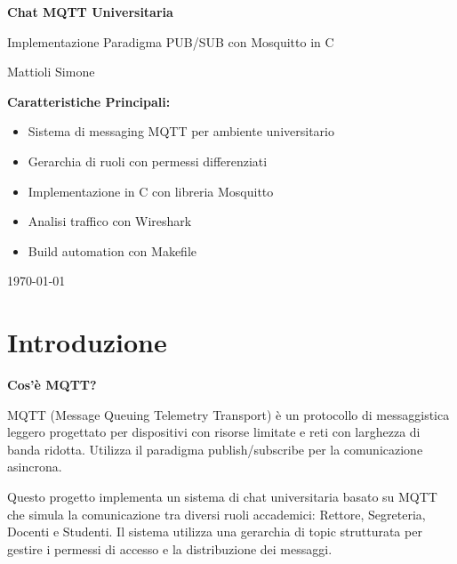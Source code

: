 \documentclass[12pt,a4paper]{article}
\begin{document}
\begin{titlepage}
    \centering
    \vspace*{2cm}
    
    {\Huge\bfseries Chat MQTT Universitaria}
        
    \vspace{2cm}
    {\large Implementazione Paradigma PUB/SUB con Mosquitto in C}
    
    \vspace{3cm}
    \vspace{1cm}
    {\Large Mattioli Simone}
    \vspace{3cm}
    
    \begin{tcolorbox}[colback=blue!5!white,colframe=blue!75!black]
        \centering
        \textbf{Caratteristiche Principali:}
        \begin{itemize}[leftmargin=2cm]
            \item Sistema di messaging MQTT per ambiente universitario
            \item Gerarchia di ruoli con permessi differenziati
            \item Implementazione in C con libreria Mosquitto
            \item Analisi traffico con Wireshark
            \item Build automation con Makefile
        \end{itemize}
    \end{tcolorbox}
    
    \vfill
    {\large \today}
\end{titlepage}

\newpage
\tableofcontents
\newpage

\section{Introduzione}

\begin{infobox}
\textbf{Cos'è MQTT?}

MQTT (Message Queuing Telemetry Transport) è un protocollo di messaggistica leggero progettato per dispositivi con risorse limitate e reti con larghezza di banda ridotta. Utilizza il paradigma publish/subscribe per la comunicazione asincrona.
\end{infobox}

Questo progetto implementa un sistema di chat universitaria basato su MQTT che simula la comunicazione tra diversi ruoli accademici: Rettore, Segreteria, Docenti e Studenti. Il sistema utilizza una gerarchia di topic strutturata per gestire i permessi di accesso e la distribuzione dei messaggi.
\end{document}
